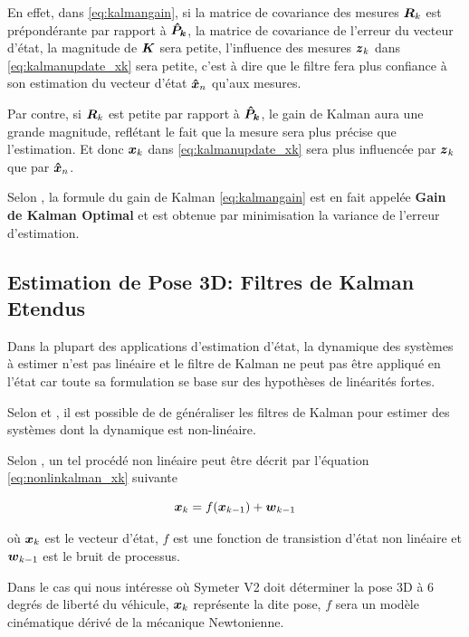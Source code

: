 \documentclass[12pt,a4paper]{report}
\begin{document}
	\para En effet, dans \ref{eq:kalmangain}, si la matrice de covariance des mesures $\boldsymbol{R}_k$ est prépondérante par rapport à $\boldsymbol{\hat{P}_k}$, la matrice de covariance de l'erreur du vecteur d'état, la magnitude de $\boldsymbol{K}$ sera petite, l'influence des mesures $\boldsymbol{z}_k$ dans \ref{eq:kalmanupdate_xk} sera petite, c'est à dire que le filtre fera plus confiance à son estimation du vecteur d'état $\boldsymbol{\hat{x}}_n$ qu'aux mesures.
	
	\para Par contre, si $\boldsymbol{R}_k$ est petite par rapport à $\boldsymbol{\hat{P}_k}$, le gain de Kalman aura une grande magnitude, reflétant le fait que la mesure sera plus précise que l'estimation. Et donc $\boldsymbol{x}_k$ dans \ref{eq:kalmanupdate_xk} sera plus influencée par $\boldsymbol{z}_k$ que par $\boldsymbol{\hat{x}}_n$.
	
	\para Selon \cite{zarchan_fundamentals_2009}, la formule du gain de Kalman \ref{eq:kalmangain} est en fait appelée \textbf{Gain de Kalman Optimal} et est obtenue par minimisation la variance de l'erreur d'estimation.
	
	
	\subsection{Estimation de Pose 3D: Filtres de Kalman Etendus}
	
	Dans la plupart des applications d'estimation d'état, la dynamique des systèmes à estimer n'est pas linéaire et le filtre de Kalman ne peut pas être appliqué en l'état car toute sa formulation se base sur des hypothèses de linéarités fortes.
	
	\para Selon \cite{menegatti_generalized_2016} et \cite{zarchan_fundamentals_2009}, il est possible de de généraliser les filtres de Kalman pour estimer des systèmes dont la dynamique est non-linéaire.
	
	\para Selon \cite{menegatti_generalized_2016}, un tel procédé non linéaire peut être décrit par l'équation \ref{eq:nonlinkalman_xk} suivante
	
	\begin{equation}
	\label{eq:nonlinkalman_xk}
	\boldsymbol{x}_k = f(\boldsymbol{x}_{k-1}) + \boldsymbol{w}_{k-1}
	\end{equation}
	
	où $\boldsymbol{x}_k$ est le vecteur d'état, $f$ est une fonction de transistion d'état non linéaire et $\boldsymbol{w}_{k-1}$ est le bruit de processus.
	
	\para Dans le cas qui nous intéresse où Symeter V2 doit déterminer la pose 3D à 6 degrés de liberté du véhicule, $\boldsymbol{x}_k$ représente la dite pose, $f$ sera un modèle cinématique dérivé de la mécanique Newtonienne.
	
\end{document}
